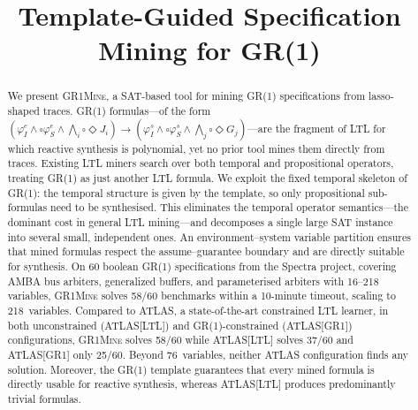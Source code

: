 \documentclass[year=25]{fmcad}
\newcommand{\always}{\square}
\newcommand{\eventually}{\Diamond}
\newcommand{\GRone}{GR(1)\xspace}
\newcommand{\toolname}{\textsc{GR1Mine}\xspace}
\begin{document}
\title{Template-Guided Specification Mining for GR(1)}

\author{
}

\maketitle

\begin{abstract}
We present \toolname, a SAT-based tool for mining \GRone specifications
from lasso-shaped traces.
\GRone formulas---of the form
$(\varphi_I^e \land \always \varphi_S^e \land \bigwedge_i
\always\eventually J_i) \rightarrow (\varphi_I^s \land \always
\varphi_S^s \land \bigwedge_j \always\eventually G_j)$---are the
fragment of LTL for which reactive synthesis is polynomial, yet no
prior tool mines them directly from traces.
Existing LTL miners search over both temporal and propositional
operators, treating GR(1) as just another LTL formula.
We exploit the fixed temporal skeleton of \GRone: the temporal
structure is given by the template, so only propositional
sub-formulas need to be synthesised.
This eliminates the temporal operator semantics---the dominant cost
in general LTL mining---and decomposes a single large SAT instance
into several small, independent ones.
An environment--system variable partition ensures that mined
formulas respect the assume--guarantee boundary and are directly
suitable for synthesis.
On 60 boolean \GRone specifications from the
Spectra project, covering AMBA bus arbiters, generalized buffers,
and parameterised arbiters with 16--218 variables, \toolname solves
58/60 benchmarks within a 10-minute timeout, scaling to
218~variables.
Compared to ATLAS, a state-of-the-art constrained LTL learner, in
both unconstrained (ATLAS[LTL]) and \GRone-constrained
(ATLAS[GR1]) configurations, \toolname solves 58/60 while
ATLAS[LTL] solves 37/60 and ATLAS[GR1] only 25/60.
Beyond 76~variables, neither ATLAS configuration finds any solution.
Moreover, the \GRone template guarantees that every mined formula
is directly usable for reactive synthesis, whereas ATLAS[LTL]
produces predominantly trivial formulas.
\end{abstract}











\clearpage
\appendix

\end{document}
